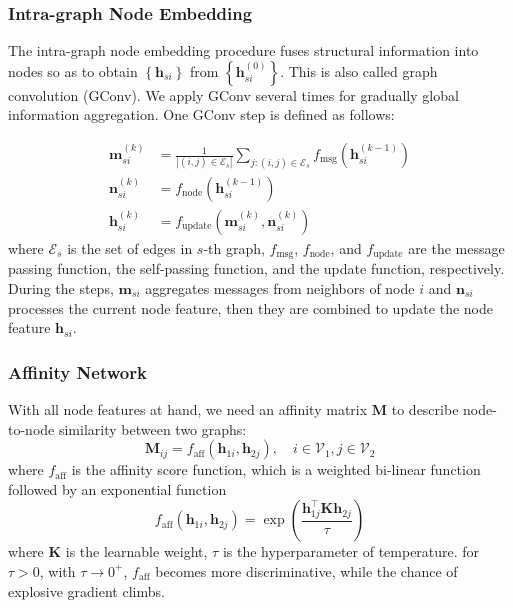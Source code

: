 \documentclass[a4paper]{article}
\newcommand{\set}[1]{\left\{#1\right\}}
\begin{document}
\subsubsection{Intra-graph Node Embedding}
The intra-graph node embedding procedure fuses structural information into nodes so as to obtain $\set{\mathbf{h}_{si}}$ from $\set{\mathbf{h}_{si}^{(0)}}$. This is also called graph convolution (GConv). We apply GConv several times for gradually global information aggregation. One GConv step is defined as follows:

\begin{align}
    \mathbf{m}_{si}^{(k)} &= \frac{1}{\left|(i,j) \in \mathcal{E}_s\right|} \sum_{j: (i,j) \in \mathcal{E}_s} f_{\mathrm{msg}}\left(\mathbf{h}_{si}^{(k-1)}\right)\\
    \mathbf{n}_{si}^{(k)} &= f_{\mathrm{node}}\left( \mathbf{h}_{si}^{(k-1)} \right)\\
    \mathbf{h}_{si}^{(k)} &= f_{\mathrm{update}}\left( \mathbf{m}_{si}^{(k)}, \mathbf{n}_{si}^{(k)} \right)
\end{align}
where $\mathcal{E}_s$ is the set of edges in $s$-th graph, $f_{\mathrm{msg}}$, $f_{\mathrm{node}}$, and $f_{\mathrm{update}}$ are the message passing function, the self-passing function, and the update function, respectively. 
During the steps, $\mathbf{m}_{si}$ aggregates messages from neighbors of node $i$ and $\mathbf{n}_{si}$ processes the current node feature, then they are combined to update the node feature $\mathbf{h}_{si}$. 

\subsubsection{Affinity Network}
With all node features at hand, we need an affinity matrix $\mathbf{M}$ to describe node-to-node similarity between two graphs:
$$
\mathbf{M}_{ij} = f_{\mathrm{aff}}\left(\mathbf{h}_{1i}, \mathbf{h}_{2j}\right), \quad i\in \mathcal{V}_1, j\in \mathcal{V}_2
$$
where $f_{\mathrm{aff}}$ is the affinity score function, which is a weighted bi-linear function followed by an exponential function 
$$
f_{\mathrm{aff}}\left(\mathbf{h}_{1i}, \mathbf{h}_{2j} \right) = \exp\left(\frac{ \mathbf{h}_{1j}^\top \mathbf{K}  \mathbf{h}_{2j}}{\tau}\right)
$$
where $\mathbf{K}$ is the learnable weight, $\tau$ is the hyperparameter of temperature. for $\tau > 0$, with $\tau \rightarrow 0^+$, $f_{\mathrm{aff}}$ becomes more discriminative, while the chance of explosive gradient climbs.
\end{document}

